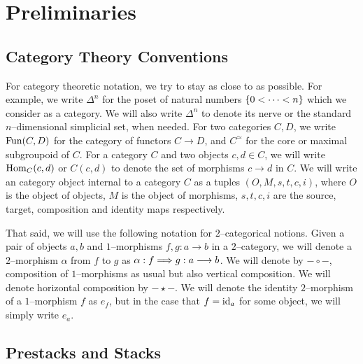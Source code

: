 \documentclass[11pt]{amsart}
\begin{document}

\section{Preliminaries}\label{sec:Prelim}

\subsection{Category Theory Conventions}

For category theoretic notation, we try to stay as close to \cite{HTT} as
possible. For example, we write $\Delta^n$ for the poset of natural numbers
$\set{0 < \dots < n}$ which we consider as a category. We will also write
$\Delta^n$ to denote its nerve or the standard $n$--dimensional
simplicial set, when needed.
For two categories $C, D$, we write $\mathrm{Fun}(C, D)$ for the
category of functors $C \to D$, and $C^\simeq$ for the core or maximal
subgroupoid of $C$. For a category $C$ and two objects
$c, d \in C$, we will write $\mathrm{Hom}_C(c, d)$ or $C(c, d)$ to denote
the set of morphisms $c \to d$ in $C$.
We will write an category object internal to a category $C$
as a tuples $(O, M, s, t, c, i)$, where $O$ is the object of objects,
$M$ is the object of morphisms, $s, t, c, i$ are the source, target,
composition and identity maps respectively.

That said, we will use the following notation for $2$--categorical notions.
Given a pair of objects $a, b$ and $1$--morphisms $f, g : a \to b$ in a
$2$--category, we will denote a $2$--morphism $\alpha$ from $f$ to $g$ as
$\alpha : f \To g : a \to b$. We will denote by $- \circ -$, composition of
$1$--morphisms as usual but also vertical composition. We will denote
horizontal composition by $- \star -$. We will denote the identity $2$--morphism
of a $1$--morphism $f$ as $e_f$, but in the case that $f = \mathrm{id}_a$ for some
object, we will simply write $e_a$.

\subsection{Prestacks and Stacks}
\end{document}
